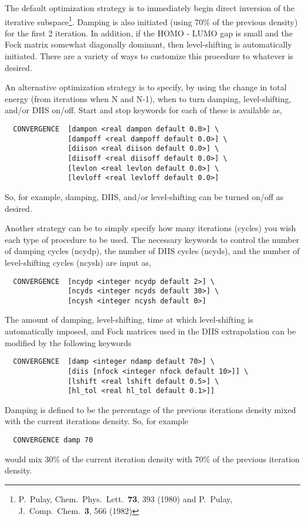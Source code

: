 The default optimization strategy is to immediately begin direct
inversion of the iterative subspace\footnote {P.~Pulay, Chem.\ Phys.\ 
  Lett.\ {\bf 73}, 393 (1980) and P.~Pulay, J.~Comp.~Chem.~{\bf 3},
  566 (1982)}.  Damping is also initiated (using 70\% of the previous
density) for the first 2 iteration.  In addition, if the HOMO - LUMO
gap is small and the Fock matrix somewhat diagonally dominant, then
level-shifting is automatically initiated.  There are a variety of ways
to customize this procedure to whatever is desired.

An alternative optimization strategy is to specify, by using the change 
in total energy (from iterations when N and N-1), when to turn
damping, level-shifting, and/or DIIS on/off.  Start and stop keywords for
each of these is available as,
\begin{verbatim}
  CONVERGENCE  [dampon <real dampon default 0.0>] \
               [dampoff <real dampoff default 0.0>] \
               [diison <real diison default 0.0>] \
               [diisoff <real diisoff default 0.0>] \
               [levlon <real levlon default 0.0>] \
               [levloff <real levloff default 0.0>]
\end{verbatim}

So, for example, damping, DIIS, and/or level-shifting can be turned
on/off as desired.

Another strategy can be to simply specify how many iterations (cycles) you wish
each type of procedure to be used.  The necessary keywords to control
the number of damping cycles (ncydp), the number of DIIS cycles
(ncyds), and the number of level-shifting cycles (ncysh) are input as,
\begin{verbatim}
  CONVERGENCE  [ncydp <integer ncydp default 2>] \
               [ncyds <integer ncyds default 30>] \
               [ncysh <integer ncysh default 0>]
\end{verbatim}

The amount of damping, level-shifting, time at which level-shifting is
automatically imposed, and Fock matrices used in the DIIS
extrapolation can be modified by the following keywords
\begin{verbatim}
  CONVERGENCE  [damp <integer ndamp default 70>] \
               [diis [nfock <integer nfock default 10>]] \
               [lshift <real lshift default 0.5>] \
               [hl_tol <real hl_tol default 0.1>]]
\end{verbatim}

Damping is defined to be the percentage of the previous iterations
density mixed with the current iterations density.  So, for example 
\begin{verbatim}
  CONVERGENCE damp 70
\end{verbatim}
would mix 30\% of the current iteration density with 70\% of the
previous iteration density.


